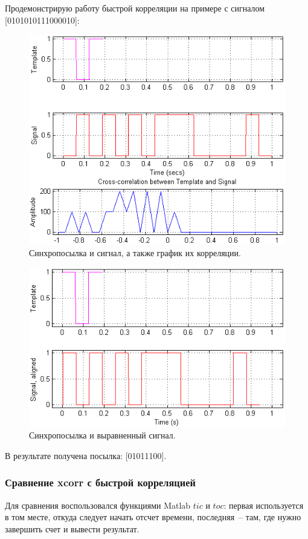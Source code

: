 \documentclass[12pt,a4paper]{article}
\begin{document}
Продемонстрирую работу быстрой корреляции на примере с сигналом [0101010111000010]:
\begin{figure}[H]
\includegraphics[width=\linewidth]{fcorr_tsa}
\caption{Синхропосылка и сигнал, а также график их корреляции.}
\label{img:fcorr_tsa}
\end{figure}
\begin{figure}[H]
\includegraphics[width=\linewidth]{fcorr_ts}
\caption{Синхропосылка и выравненный сигнал.}
\label{img:fcorr_ts}
\end{figure}

В результате получена посылка: [01011100].

\subsubsection{Сравнение xcorr с быстрой корреляцией}
Для сравнения воспользовался функциями Matlab $tic$ и $toc$: первая используется в том месте, откуда следует начать отсчет времени, последняя~-- там, где нужно завершить счет и вывести результат.
\end{document}
